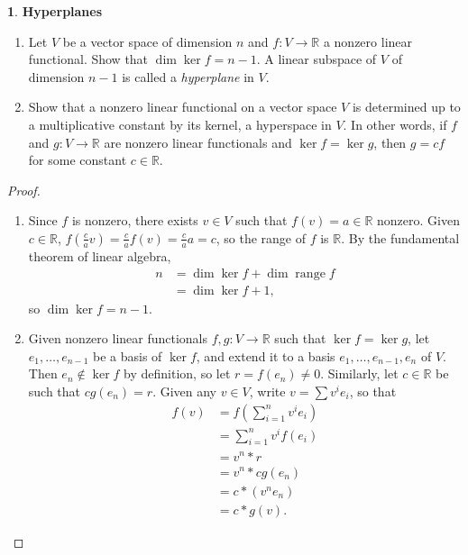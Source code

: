 \documentclass[12pt]{article}
\DeclareMathOperator{\range}{range}
\theoremstyle{definition}
\newtheorem{ex}{}[section]
\begin{document}
\begin{ex}
	\textbf{Hyperplanes}
	\begin{enumerate}[label=(\alph*)]
		\item Let $V$ be a vector space of dimension $n$ and $f: V \to \mathbb{R}$ a nonzero linear functional.
		      Show that $\dim \ker f = n - 1$. A linear subspace of $V$ of dimension $n - 1$ is called a \textit{hyperplane} in $V$.
		\item Show that a nonzero linear functional on a vector space $V$ is determined up to a multiplicative constant by its kernel, a hyperspace in $V$.
		      In other words, if $f$ and $g: V \to \mathbb{R}$ are nonzero linear functionals and $\ker f = \ker g$, then $g = cf$ for some constant $c \in \mathbb{R}$.
	\end{enumerate}
\end{ex}
\begin{proof}
	\begin{enumerate}[label=(\alph*)]
		\item Since $f$ is nonzero, there exists $v \in V$ such that $f(v) = a \in \mathbb{R}$ nonzero.
		      Given $c \in \mathbb{R}$, $f(\frac{c}{a}v) = \frac{c}{a}f(v) = \frac{c}{a}a = c$, so the range of $f$ is $\mathbb{R}$.
		      By the fundamental theorem of linear algebra, \begin{align*}
			      n & = \dim\ker f + \dim \range f \\
			        & = \dim\ker f + 1,
		      \end{align*}
		      so $\dim \ker f = n - 1$.
		\item Given nonzero linear functionals $f, g : V \to \mathbb{R}$ such that $\ker f = \ker g$, let $e_1, \dots, e_{n-1}$ be a basis of $\ker f$, and extend it to a basis $e_1, \dots, e_{n-1}, e_n$ of $V$.
		      Then $e_n \notin \ker f$ by definition, so let $r = f(e_n) \neq 0$.
		      Similarly, let $c \in \mathbb{R}$ be such that $cg(e_n) = r$.
		      Given any $v \in V$, write $v = \sum v^i e_i$, so that \begin{align*}
			      f(v) & = f\left(\sum_{i = 1}^n v^i e_i\right) \\
			           & = \sum_{i = 1}^n v^i f(e_i)            \\
			           & = v^n * r                              \\
			           & = v^n * cg(e_n)                        \\
			           & = c * (v^ne_n)                         \\
			           & = c * g(v).
		      \end{align*}
	\end{enumerate}
\end{proof}
\end{document}
